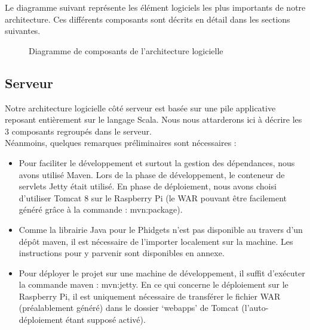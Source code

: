 Le diagramme suivant représente les élément logiciels les plus importants de notre architecture. Ces différents composants sont décrits en détail dans les sections suivantes.
\begin{figure}[H]
    \begin{center}

        \caption{Diagramme de composants de l'architecture logicielle}
    \end{center}
\end{figure}
\subsection{Serveur}
Notre architecture logicielle côté serveur est basée sur une pile applicative reposant entièrement sur le langage Scala. Nous nous attarderons ici à décrire les 3 composants regroupés dans le serveur.\\

Néanmoins, quelques remarques préliminaires sont nécessaires :
\begin{itemize}
\item Pour faciliter le développement et surtout la gestion des dépendances, nous avons utilisé Maven. Lors de la phase de développement, le conteneur de servlets Jetty était utilisé. En phase de déploiement, nous avons choisi d’utiliser Tomcat 8 sur le Raspberry Pi (le WAR pouvant être facilement généré grâce à la commande : mvn:package).
\item Comme la librairie Java pour le Phidgets n’est pas disponible au travers d’un dépôt maven, il est nécessaire de l’importer localement sur la machine. Les instructions pour y parvenir sont disponibles en annexe.
\item Pour déployer le projet sur une machine de développement, il suffit d’exécuter la commande maven : mvn:jetty. En ce qui concerne le déploiement sur le Raspberry Pi, il est uniquement nécessaire de transférer le fichier WAR (préalablement généré) dans le dossier ‘webapps’ de Tomcat (l’auto-déploiement étant supposé activé).\\
\end{itemize}

